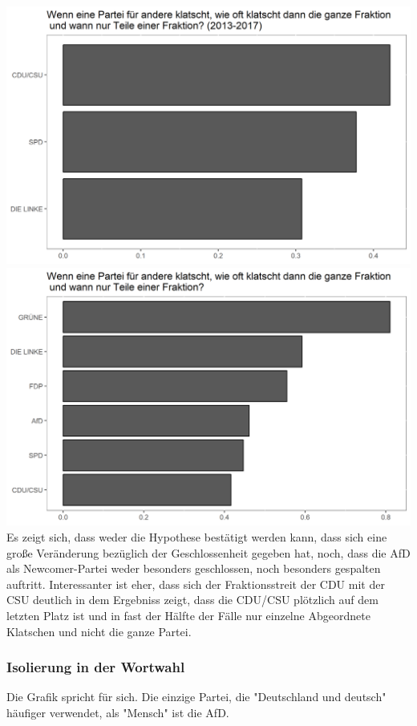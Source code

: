 \includegraphics[width=\linewidth]{Grafiken/Geschlossenheit13.png}
\includegraphics[width=\linewidth]{Grafiken/Geschlossenheit17.png}\\

Es zeigt sich, dass weder die Hypothese bestätigt werden kann, dass sich eine große Veränderung bezüglich der Geschlossenheit gegeben hat, noch, dass die AfD als Newcomer-Partei weder besonders geschlossen, noch besonders gespalten auftritt. Interessanter ist eher, dass sich der Fraktionsstreit der CDU mit der CSU deutlich in dem Ergebniss zeigt, dass die CDU/CSU plötzlich auf dem letzten Platz ist und in fast der Hälfte der Fälle nur einzelne Abgeordnete Klatschen und nicht die ganze Partei. 

\subsubsection{Isolierung in der Wortwahl} 
Die Grafik spricht für sich. Die einzige Partei, die "Deutschland und deutsch" häufiger verwendet, als "Mensch" ist die AfD. \\

